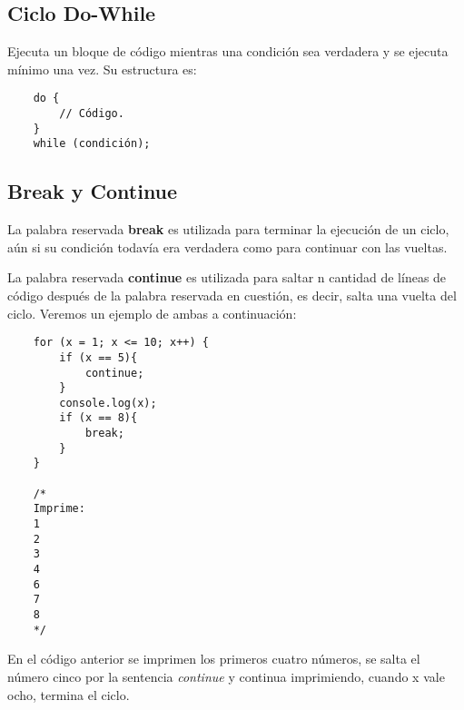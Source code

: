 \subsection{Ciclo Do-While}

Ejecuta un bloque de código mientras una condición sea verdadera y se ejecuta mínimo una vez. Su estructura es:
\begin{lstlisting}
    do {
        // Código.
    }
    while (condición);
\end{lstlisting}


\subsection{Break y Continue}

La palabra reservada \textbf{break} es utilizada para terminar la ejecución de un ciclo, aún si su condición todavía era verdadera como para continuar con las vueltas.

La palabra reservada \textbf{continue} es utilizada para saltar n cantidad de líneas de código después de la palabra reservada en cuestión, es decir, salta una vuelta del ciclo. Veremos un ejemplo de ambas a continuación:
\begin{lstlisting}
    for (x = 1; x <= 10; x++) {
        if (x == 5){
            continue;
        }
        console.log(x);
        if (x == 8){
            break;
        }
    }

    /*
    Imprime:
    1
    2
    3
    4
    6
    7
    8
    */
\end{lstlisting}

En el código anterior se imprimen los primeros cuatro números, se salta el número cinco por la sentencia \textit{continue} y continua imprimiendo, cuando x vale ocho, termina el ciclo.
